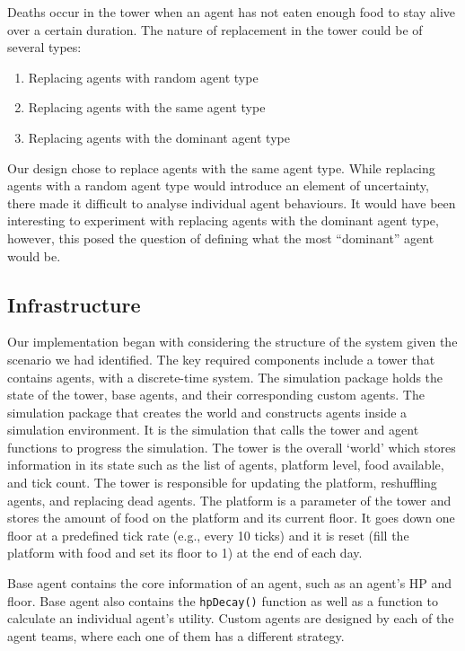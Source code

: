 Deaths occur in the tower when an agent has not eaten enough food to stay alive over a certain duration. The nature of replacement in the tower could be of several types:
\begin{enumerate}
    \item Replacing agents with random agent type
    \item Replacing agents with the same agent type
    \item Replacing agents with the dominant agent type
\end{enumerate}

Our design chose to replace agents with the same agent type. While replacing agents with a random agent type would introduce an element of uncertainty, there made it difficult to analyse individual agent behaviours. It would have been interesting to experiment with replacing agents with the dominant agent type, however, this posed the question of defining what the most “dominant” agent would be. 

\subsection{Infrastructure}

Our implementation began with considering the structure of the system given the scenario we had identified. The key required components include a tower that contains agents, with a discrete-time system.
The simulation package holds the state of the tower, base agents, and their corresponding custom agents. The simulation package that creates the world and constructs agents inside a simulation environment. It is the simulation that calls the tower and agent functions to progress the simulation.
The tower is the overall `world' which stores information in its state such as the list of agents, platform level, food available, and tick count. The tower is responsible for updating the platform, reshuffling agents, and replacing dead agents.
The platform is a parameter of the tower and stores the amount of food on the platform and its current floor. It goes down one floor at a predefined tick rate (e.g., every 10 ticks) and it is reset (fill the platform with food and set its floor to 1) at the end of each day.

Base agent contains the core information of an agent, such as an agent's HP and floor. Base agent also contains the \lstinline$hpDecay()$ function as well as a function to calculate an individual agent's utility. 
Custom agents are designed by each of the agent teams, where each one of them has a different strategy.

